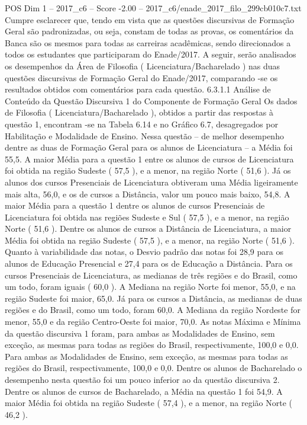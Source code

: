 \begin{textsample}{POS Dim 1 – 2017\_c6 – Score -2.00 – 2017\_c6/enade\_2017\_filo\_299cb010c7.txt}
Cumpre esclarecer que, tendo em vista que as questões discursivas de Formação Geral são padronizadas, ou seja, constam de todas as provas, os comentários da Banca são os mesmos para todas as carreiras acadêmicas, sendo direcionados a todos os estudantes que participaram do Enade/2017.
A seguir, serão analisados os desempenhos da Área de Filosofia ( Licenciatura/Bacharelado ) nas duas questões discursivas de Formação Geral do Enade/2017, comparando -se os resultados obtidos com comentários para cada questão. 6.3.1.1 Análise de Conteúdo da Questão Discursiva 1 do Componente de Formação Geral Os dados de Filosofia ( Licenciatura/Bacharelado ), obtidos a partir das respostas à questão 1, encontram -se na Tabela 6.14 e no Gráfico 6.7, desagregados por Habilitação e Modalidade de Ensino.
Nessa questão – de melhor desempenho dentre as duas de Formação Geral para os alunos de Licenciatura – a Média foi 55,5.
A maior Média para a questão 1 entre os alunos de cursos de Licenciatura foi obtida na região Sudeste ( 57,5 ), e a menor, na região Norte ( 51,6 ).
Já os alunos dos cursos Presenciais de Licenciatura obtiveram uma Média ligeiramente mais alta, 56,0, e os de cursos a Distância, valor um pouco mais baixo, 54,8.
A maior Média para a questão 1 dentre os alunos de cursos Presenciais de Licenciatura foi obtida nas regiões Sudeste e Sul ( 57,5 ), e a menor, na região Norte ( 51,6 ).
Dentre os alunos de cursos a Distância de Licenciatura, a maior Média foi obtida na região Sudeste ( 57,5 ), e a menor, na região Norte ( 51,6 ).
Quanto à variabilidade das notas, o Desvio padrão das notas foi 28,9 para os alunos de Educação Presencial e 27,4 para os de Educação a Distância.
Para os cursos Presenciais de Licenciatura, as medianas de três regiões e do Brasil, como um todo, foram iguais ( 60,0 ).
A Mediana na região Norte foi menor, 55,0, e na região Sudeste foi maior, 65,0.
Já para os cursos a Distância, as medianas de duas regiões e do Brasil, como um todo, foram 60,0.
A Mediana da região Nordeste for menor, 55,0 e da região Centro-Oeste foi maior, 70,0.
As notas Máxima e Mínima da questão discursiva 1 foram, para ambas as Modalidades de Ensino, sem exceção, as mesmas para todas as regiões do Brasil, respectivamente, 100,0 e 0,0.
Para ambas as Modalidades de Ensino, sem exceção, as mesmas para todas as regiões do Brasil, respectivamente, 100,0 e 0,0.
Dentre os alunos de Bacharelado o desempenho nesta questão foi um pouco inferior ao da questão discursiva 2.
Dentre os alunos de cursos de Bacharelado, a Média na questão 1 foi 54,9.
A maior Média foi obtida na região Sudeste ( 57,4 ), e a menor, na região Norte ( 46,2 ).

\end{textsample}

